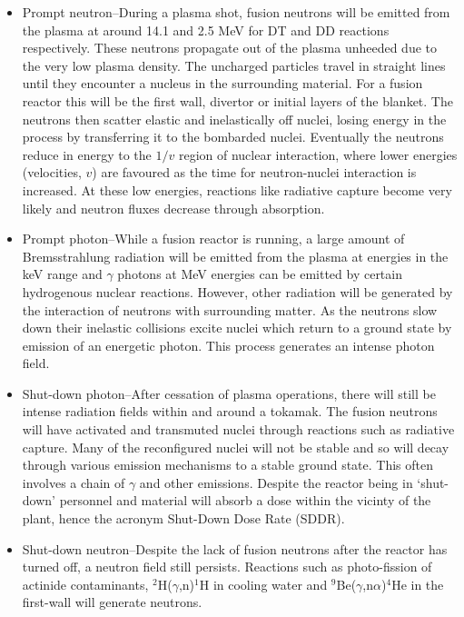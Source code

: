 \begin{itemize}
  \item Prompt neutron--During a plasma shot, fusion neutrons will be emitted from the plasma at around 14.1 and 2.5 MeV for DT and DD reactions respectively. These neutrons propagate out of the plasma unheeded due to the very low plasma density. The uncharged particles travel in straight lines until they encounter a nucleus in the surrounding material. For a fusion reactor this will be the first wall, divertor or initial layers of the blanket. The neutrons then scatter elastic and inelastically off nuclei, losing energy in the process by transferring it to the bombarded nuclei. Eventually the neutrons reduce in energy to the $1/v$ region of nuclear interaction, where lower energies (velocities, $v$) are favoured as the time for neutron-nuclei interaction is increased. At these low energies, reactions like radiative capture become very likely and neutron fluxes decrease through absorption.
  \item Prompt photon--While a fusion reactor is running, a large amount of Bremsstrahlung radiation will be emitted from the plasma at energies in the keV range and $\gamma$ photons at MeV energies can be emitted by certain hydrogenous nuclear reactions. However, other radiation will be generated by the interaction of neutrons with surrounding matter. As the neutrons slow down their inelastic collisions excite nuclei which return to a ground state by emission of an energetic photon. This process generates an intense photon field.
  \item Shut-down photon--After cessation of plasma operations, there will still be intense radiation fields within and around a tokamak. The fusion neutrons will have activated and transmuted nuclei through reactions such as radiative capture. Many of the reconfigured nuclei will not be stable and so will decay through various emission mechanisms to a stable ground state. This often involves a chain of $\gamma$ and other emissions. Despite the reactor being in `shut-down' personnel and material will absorb a dose within the vicinty of the plant, hence the acronym Shut-Down Dose Rate (SDDR).
  \item Shut-down neutron--Despite the lack of fusion neutrons after the reactor has turned off, a neutron field still persists. Reactions such as photo-fission of actinide contaminants, $^{2}$H($\gamma$,n)$^{1}$H in cooling water \cite{Kodeli1995} and $^{9}$Be($\gamma$,n$\alpha$)$^{4}$He in the first-wall \cite{Davis2010} will generate neutrons.
\end{itemize}

